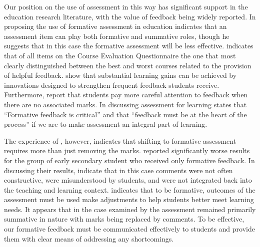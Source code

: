 Our position on the use of assessment in this way has significant support in the education research literature, with the value of feedback being widely reported. In proposing the use of formative assessment in education \citet{Bloom:1969} indicates that an assessment item can play both formative and summative roles, though he suggests that in this case the formative assessment will be less effective. \citet{Ramsden:1992} indicates that of all items on the Course Evaluation Questionnaire \cite{Ramsden:1991} the one that most clearly distinguished between the best and worst courses related to the provision of helpful feedback. \citet{Black:1998} show that substantial learning gains can be achieved by innovations designed to strengthen frequent feedback students receive. Furthermore, \citet{Black:1998} report that students pay more careful attention to feedback when there are no associated marks. In discussing assessment for learning \citet{Brown:2004} states that ``Formative feedback is critical'' and that ``feedback must be at the heart of the process'' if we are to make assessment an integral part of learning.


The experience of \citet{Smith:2005}, however, indicates that shifting to formative assessment requires more than just removing the marks. \citet{Smith:2005} reported significantly worse results for the group of early secondary student who received only formative feedback. In discussing their results, \citet{Smith:2005} indicate that in this case comments were not often constructive, were misunderstood by students, and were not integrated back into the teaching and learning context. \citet{William:2006} indicates that to be formative, outcomes of the assessment must be used make adjustments to help students better meet learning needs. It appears that in the case examined by \citet{Smith:2005} the assessment remained primarily summative in nature with marks being replaced by comments. To be effective, our formative feedback must be communicated effectively to students and provide them with clear means of addressing any shortcomings.

